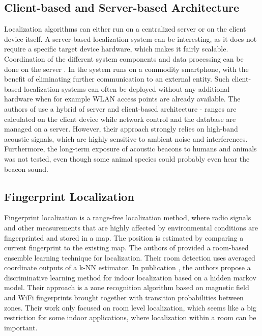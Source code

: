 \subsection{Client-based and Server-based Architecture}
Localization algorithms can either run on a centralized server or on the client device itself. A server-based localization system can be interesting, as it does not require a specific target device hardware, which makes it fairly scalable. Coordination of the different system components and data processing can be done on the server \cite{Delmastro}.
In \cite{Carrera} the system runs on a commodity smartphone, with the benefit of eliminating further communication to an external entity. Such client-based localization systems can often be deployed without any additional hardware when for example WLAN access points are already available. The authors of \cite{Guoguo} use a hybrid of server and client-based architecture - ranges are calculated on the client device while network control and the database are managed on a server. However, their approach strongly relies on high-band acoustic signals, which are highly sensitive to ambient noise and interferences. Furthermore, the long-term exposure of acoustic beacons to humans and animals was not tested, even though some animal species could probably even hear the beacon sound.

\subsection{Fingerprint Localization}
Fingerprint localization is a range-free localization method, where radio signals and other measurements that are highly affected by environmental conditions are fingerprinted and stored in a map. The position is estimated by comparing a current fingerprint to the existing map. The authors of \cite{Taniuchi} provided a room-based ensemble learning technique for localization. Their room detection uses averaged coordinate outputs of a k-NN estimator. In publication \cite{Carrera2}, the authors propose a discriminative learning method for indoor localization based on a hidden markov model. Their approach is a zone recognition algorithm based on magnetic field and WiFi fingerprints brought together with transition probabilities between zones. Their work only focused on room level localization, which seems like a big restriction for some indoor applications, where localization within a room can be important.

